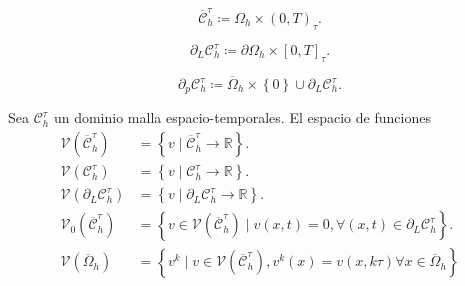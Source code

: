 \begin{definition}
    \begin{equation*}
        \overline{\mathcal{C}}^{\tau}_{h}\coloneqq
        \Omega_{h}\times
        {\left(0,T\right)}_{\tau}.
    \end{equation*}
\end{definition}

\begin{definition}
    \begin{equation*}
        \partial_{L}
        \mathcal{C}^{\tau}_{h}\coloneqq
        \partial\Omega_{h}\times
        {\left[0,T\right]}_{\tau}.
    \end{equation*}
\end{definition}

\begin{definition}
    \begin{equation*}
        \partial_{p}
        \mathcal{C}^{\tau}_{h}\coloneqq
        \overline{\Omega}_{h}\times
        \left\{0\right\}\cup
        \partial_{L}
        \mathcal{C}^{\tau}_{h}.
    \end{equation*}
\end{definition}

\begin{definition}
    Sea $\mathcal{C}^{\tau}_{h}$ un dominio malla espacio-temporales.
    El espacio de funciones
    \begin{align*}
        \mathcal{V}
        \left(
        \overline{\mathcal{C}}^{\tau}_{h}
        \right) & =
        \left\{
        v\mid
        \overline{\mathcal{C}}^{\tau}_{h}\to\mathbb{R}
        \right\}.   \\
        \mathcal{V}
        \left(
        \mathcal{C}^{\tau}_{h}
        \right) & =
        \left\{
        v\mid
        \mathcal{C}^{\tau}_{h}\to\mathbb{R}
        \right\}.   \\
        \mathcal{V}
        \left(
        \partial_{L}\mathcal{C}^{\tau}_{h}
        \right) & =
        \left\{
        v\mid
        \partial_{L}\mathcal{C}^{\tau}_{h}\to\mathbb{R}
        \right\}.   \\
        \mathcal{V}_{0}
        \left(
        \overline{\mathcal{C}}^{\tau}_{h}
        \right) & =
        \left\{
        v\in
        \mathcal{V}\left(\overline{\mathcal{C}}^{\tau}_{h}\right)\mid
        v\left(x,t\right)=0,
        \forall\left(x,t\right)\in\partial_{L}\mathcal{C}^{\tau}_{h}
        \right\}.   \\
        \mathcal{V}
        \left(
        \overline{\Omega}_{h}
        \right) & =
        \left\{
        v^{k}\mid
        v\in
        \mathcal{V}
        \left(
        \overline{\mathcal{C}}^{\tau}_{h}
        \right),
        v^{k}\left(x\right)=
        v\left(x,k\tau\right)
        \forall x\in\overline{\Omega}_{h}
        \right\}
    \end{align*}
\end{definition}

